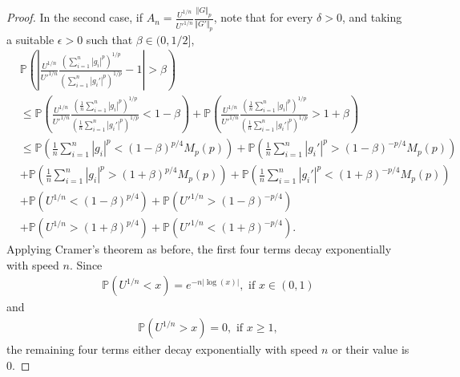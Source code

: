 \documentclass[10pt]{amsart}
\newcounter{theor}
\numberwithin{equation}{section}
\begin{document}
\begin{proof}
In the second case, if $A_n = \frac{U^{1/n}}{U'^{1/n}} \frac{\Vert G \Vert _p}{\Vert G' \Vert _p}$, note that for every $\delta >0$, and taking a suitable $\epsilon>0$ such that $\beta \in (0, 1/2]$,
\begin{align*}
& \mathbb{P} \left( \left| \frac{U^{1/n}}{U'^{1/n}} \frac{\left(\sum _{i=1}^n \left| g_i  \right|^p  \right)^{1/p} }{\left(\sum _{i=1}^n \left| g_i'  \right|^p \right)^{1/p}} - 1 \right| > \beta \right)  
 \\
 & \leq \mathbb{P} \left( \frac{U^{1/n}}{U'^{1/n}} \frac{ \left( \frac{1}{n} \sum _{i=1}^n \left| g_i  \right|^p  \right)^{1/p} }{\left(\frac{1}{n}\sum _{i=1}^n \left| g_i'  \right|^p \right)^{1/p}} < 1- \beta \right) + 
 \mathbb{P} \left(  \frac{U^{1/n}}{U'^{1/n}} \frac{ \left( \frac{1}{n} \sum _{i=1}^n \left| g_i  \right|^p  \right)^{1/p} }{\left(\frac{1}{n}\sum _{i=1}^n \left| g_i'  \right|^p \right)^{1/p}} > 1+ \beta \right)
  \\
  & \leq \mathbb{P} \left( \frac{1}{n} \sum _{i=1}^n \left| g_i  \right|^p  < (1- \beta)^{p/4} M_p(p) \right)
  + \mathbb{P} \left( \frac{1}{n} \sum _{i=1}^n \left| g_i'  \right|^p  > (1- \beta)^{-p/4} M_p(p) \right)
  \\
  & + \mathbb{P} \left( \frac{1}{n} \sum _{i=1}^n \left| g_i  \right|^p  > (1+ \beta)^{p/4} M_p(p) \right)
  + \mathbb{P} \left( \frac{1}{n} \sum _{i=1}^n \left| g_i'  \right|^p  < (1+ \beta)^{-p/4} M_p(p) \right)
 \\
  & + \mathbb{P} \left( U^{1/n}  < (1 - \beta)^{p/4} \right) + 
   \mathbb{P} \left( U'^{1/n}  > (1 - \beta)^{-p/4} \right)
  \\
   & + \mathbb{P} \left( U^{1/n}  > (1 + \beta)^{p/4} \right) + 
   \mathbb{P} \left( U'^{1/n}  < (1 + \beta)^{-p/4} \right).
\end{align*} 
Applying Cramer's theorem as before, the first four terms decay exponentially with speed $n$. Since
\begin{align*}
\mathbb{P} \left( U^{1/n} < x \right) = e^{-n |\log (x) |}, \text{ if }x \in (0,1)
\end{align*}
and
\begin{align*}
\mathbb{P} \left( U^{1/n} > x \right) = 0, \text{ if }x \geq 1,
\end{align*}
the remaining four terms either decay exponentially with speed $n$ or their value is $0$.
\end{proof}
\end{document}
